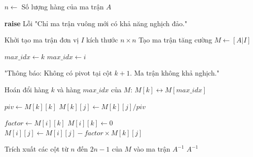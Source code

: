 \begin{algorithm}[H]
\caption{Tính ma trận nghịch đảo bằng phương pháp Gauss-Jordan}
\label{alg:inverse}
\begin{algorithmic}[1]
    \State $n \gets$ Số lượng hàng của ma trận $A$
    
        \State \textbf{raise} Lỗi "Chỉ ma trận vuông mới có khả năng nghịch đảo."
    \EndIf
    
    \State {}
    \State Khởi tạo ma trận đơn vị $I$ kích thước $n \times n$
    \State Tạo ma trận tăng cường $M \gets [A | I]$ 
    
    \State {}
        
        \State {}
        \State $max\_idx \gets k$
                \State $max\_idx \gets i$
            \EndIf
        \EndFor
        
        \State {}
            \State \Return "Thông báo: Không có pivot tại cột $k+1$. Ma trận không khả nghịch."
        \EndIf
        
        \State Hoán đổi hàng $k$ và hàng $max\_idx$ của $M$: $M[k] \leftrightarrow M[max\_idx]$
        
        \State {}
        \State $piv \gets M[k][k]$
            \State $M[k][j] \gets M[k][j] / piv$
        \EndFor
        
        \State {}
                \State $factor \gets M[i][k]$
                \State $M[i][k] \gets 0$ 
                    \State $M[i][j] \gets M[i][j] - factor \times M[k][j]$
                \EndFor
            \EndIf
        \EndFor
    \EndFor
    
    \State {}
    \State Trích xuất các cột từ $n$ đến $2n-1$ của $M$ vào ma trận $A^{-1}$
    \State \Return $A^{-1}$
\EndProcedure
\end{algorithmic}
\end{algorithm}

